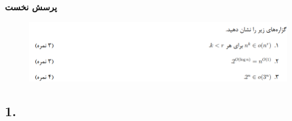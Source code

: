 \textbf{پرسش نخست}

\begin{figure}[H]
    \centering
    \includegraphics[scale=0.87]{questions/1.png}
\end{figure}

\subsection*{1.}
